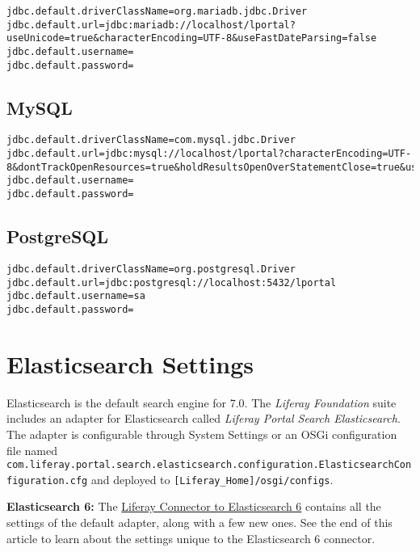 \begin{verbatim}
jdbc.default.driverClassName=org.mariadb.jdbc.Driver
jdbc.default.url=jdbc:mariadb://localhost/lportal?useUnicode=true&characterEncoding=UTF-8&useFastDateParsing=false
jdbc.default.username=
jdbc.default.password=
\end{verbatim}

\subsection{MySQL}\label{mysql}

\begin{verbatim}
jdbc.default.driverClassName=com.mysql.jdbc.Driver
jdbc.default.url=jdbc:mysql://localhost/lportal?characterEncoding=UTF-8&dontTrackOpenResources=true&holdResultsOpenOverStatementClose=true&useFastDateParsing=false&useUnicode=true
jdbc.default.username=
jdbc.default.password=
\end{verbatim}

\subsection{PostgreSQL}\label{postgresql}

\begin{verbatim}
jdbc.default.driverClassName=org.postgresql.Driver
jdbc.default.url=jdbc:postgresql://localhost:5432/lportal
jdbc.default.username=sa
jdbc.default.password=
\end{verbatim}

\section{Elasticsearch Settings}\label{elasticsearch-settings}

Elasticsearch is the default search engine for 7.0. The \emph{Liferay
Foundation} suite includes an adapter for Elasticsearch called
\emph{Liferay Portal Search Elasticsearch}. The adapter is configurable
through System Settings or an OSGi configuration file named
\texttt{com.liferay.portal.search.elasticsearch.configuration.ElasticsearchConfiguration.cfg}
and deployed to \texttt{{[}Liferay\_Home{]}/osgi/configs}.

\noindent\hrulefill

\textbf{Elasticsearch 6:} The
\href{https://web.liferay.com/marketplace/-/mp/application/106004266}{Liferay
Connector to Elasticsearch 6} contains all the settings of the default
adapter, along with a few new ones. See the end of this article to learn
about the settings unique to the Elasticsearch 6 connector.


